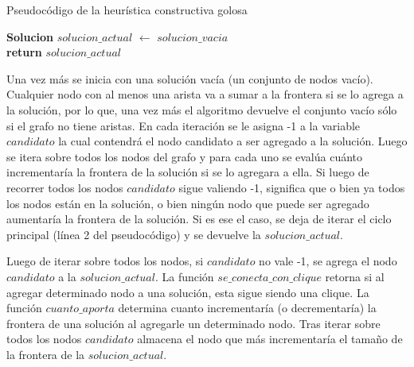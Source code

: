 \begin{algorithm}[H]
	\caption{Pseudocódigo de la heurística constructiva golosa}
	\textbf{Solucion} $solucion\_actual$ $\leftarrow$ $solucion\_vacia$\\
	\textbf{return} $solucion\_actual$
\end{algorithm}

\par{Una vez más se inicia con una solución vacía (un conjunto de nodos
vacío). Cualquier nodo con al menos una arista va a sumar a la frontera si
se lo agrega a la solución, por lo que, una vez más el algoritmo devuelve el
conjunto vacío sólo si el grafo no tiene aristas. En cada iteración se
le asigna -1 a la variable $candidato$ la cual contendrá el nodo candidato
a ser agregado a la solución. Luego se itera sobre todos los nodos del grafo
y para cada uno se evalúa cuánto incrementaría la frontera de la solución si
se lo agregara a ella. Si luego de recorrer todos los nodos $candidato$ sigue
valiendo -1, significa que o bien ya todos los nodos están en la solución,
o bien ningún nodo que puede ser agregado aumentaría la frontera de la
solución. Si es ese el caso, se deja de iterar el ciclo principal (línea 2
del pseudocódigo) y se devuelve la $solucion\_actual$.}\\

\par{Luego de iterar sobre todos los nodos, si $candidato$ no vale -1, se
agrega el nodo $candidato$ a la $solucion\_actual$. La función
$se\_conecta\_con\_clique$ retorna si al agregar determinado nodo a una
solución, esta sigue siendo una clique. La función $cuanto\_aporta$
determina cuanto incrementaría (o decrementaría) la frontera de una
solución al agregarle un determinado nodo. Tras iterar sobre todos los
nodos $candidato$ almacena el nodo que más incrementaría el tamaño de la
frontera de la $solucion\_actual$.}

